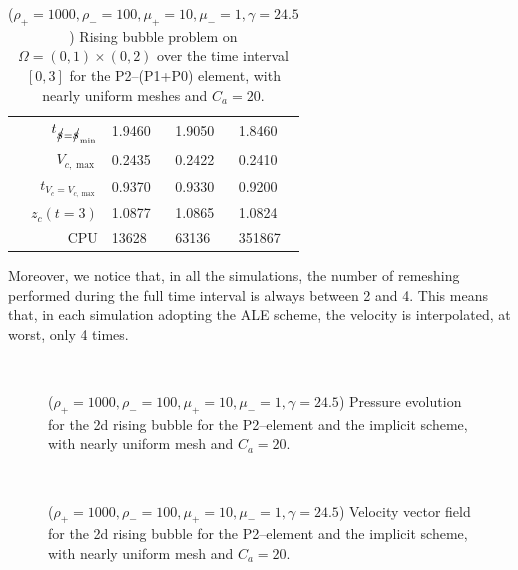 \begin{table}
\begin{tabular}{rlll}
$t_{\strikes = \strikes_{\min}}$ & 1.9460 & 1.9050 & 1.8460 \\
$V_{c,\max}$                     & 0.2435 & 0.2422 & 0.2410 \\
$t_{V_c = V_{c,\max}}$           & 0.9370 & 0.9330 & 0.9200 \\
$z_c(t=3)$                       & 1.0877 & 1.0865 & 1.0824 \\
CPU                              &  13628 &  63136 & 351867 \\
\hline
\end{tabular}
\hspace*{-3.25cm}
\caption[Navier--Stokes 2d rising bubble benchmark values P2--(P1+P0)]
{($\rho_+ = 1000,\rho_- = 100,\mu_+ = 10,\mu_- =1,\gamma = 24.5$)
Rising bubble problem on ${\Omega = (0,1) \times (0,2)}$ over the time interval
$[0,3]$ for the P2--(P1+P0) element, with nearly uniform meshes and
$C_a=20$\textdegree.}
\label{tab:risingbubble2Dp2p1p0}
\end{table}

Moreover, we notice that, in all the simulations, the number of remeshing
performed during the full time interval is always between 2 and 4. This means
that, in each simulation adopting the ALE scheme, the velocity is interpolated,
at worst, only 4 times.

\begin{figure}[htbp]
\centering
{}
\\
\caption[Navier--Stokes 2d rising bubble pressure]
{($\rho_+ = 1000,\rho_- = 100,\mu_+ = 10,\mu_- =1,\gamma = 24.5$)
Pressure evolution for the 2d rising bubble for the P2--\pdg element and the
implicit scheme, with nearly uniform mesh and $C_a=20$\textdegree.}
\label{fig:rising_bubble_2d_pressure}
\end{figure}

\begin{figure}[htbp]
\centering
{}
\\
\caption[Navier--Stokes 2d rising bubble velocity]
{($\rho_+ = 1000,\rho_- = 100,\mu_+ = 10,\mu_- =1,\gamma = 24.5$)
Velocity vector field for the 2d rising bubble for the P2--\pdg element and
the implicit scheme, with nearly uniform mesh and $C_a=20$\textdegree.}
\label{fig:rising_bubble_2d_velocity}
\end{figure}

